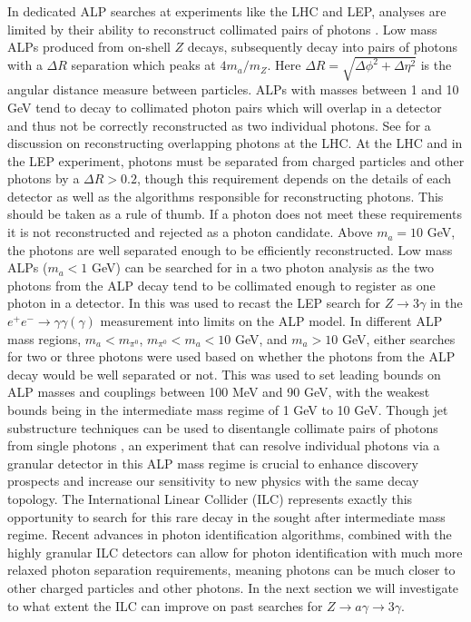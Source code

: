 \documentclass[aps,onecolumn,twoside,secnumarabic,12pt,balancelastpage,amsmath,amssymb,nofootinbib,hyperref=pdftex]{revtex4}
\begin{document}
In dedicated ALP searches at experiments like the LHC and LEP, analyses are limited by their ability to reconstruct collimated pairs of photons \cite{Mimasu:2014nea}. Low mass ALPs produced from on-shell $Z$ decays, subsequently decay into pairs of photons with a $\Delta R$ separation which peaks at $4 m_{a}/m_{Z}$. Here $\Delta R= \sqrt{\Delta\phi^{2} + \Delta\eta^{2}}$ is the angular distance measure between particles. ALPs with masses between 1 and 10 GeV tend to decay to collimated photon pairs which will overlap in a detector and thus not be correctly reconstructed as two individual photons. See \cite{Sheff:2020jyw} for a discussion on reconstructing overlapping photons at the LHC. At the LHC and in the LEP experiment, photons must be separated from charged particles and other photons by a $\Delta R  > 0.2$, though this requirement depends on the details of each detector as well as the algorithms responsible for reconstructing photons. This should be taken as a rule of thumb. If a photon does not meet these requirements it is not reconstructed and rejected as a photon candidate. Above $m_{a} = 10$ GeV, the photons are well separated enough to be efficiently reconstructed. Low mass ALPs ($m_{a} < 1$ GeV) can be searched for in a two photon analysis as the two photons from the ALP decay tend to be collimated enough to register as one photon in a detector.
\vskip 0.12in
In \cite{Jaeckel:2015jla} this was used to recast the LEP search for $Z\rightarrow 3\gamma$ in the $e^{+}e^{-}\rightarrow \gamma\gamma(\gamma)$ measurement into limits on the ALP model. In different ALP mass regions, $m_{a} < m_{\pi^{0}}$, $m_{\pi^{0}} < m_{a} < 10$ GeV, and $m_{a} > 10$ GeV, either searches for two or three photons were used based on whether the photons from the ALP decay would be well separated or not. This was used to set leading bounds on ALP masses and couplings between 100 MeV and 90 GeV, with the weakest bounds being in the intermediate mass regime of 1 GeV to 10 GeV. Though jet substructure techniques can be used to disentangle collimate pairs of photons from single photons \cite{Ellis:2012zp}, an experiment that can resolve individual photons via a granular detector in this ALP mass regime is crucial to enhance discovery prospects and increase our sensitivity to new physics with the same decay topology.
\vskip 0.12in
The International Linear Collider (ILC) represents exactly this opportunity to search for this rare decay in the sought after intermediate mass regime. Recent advances in photon identification algorithms, combined with the highly granular ILC detectors can allow for photon identification with much more relaxed photon separation requirements, meaning photons can be much closer to other charged particles and other photons. In the next section we will investigate to what extent the ILC can improve on past searches for $Z\rightarrow a\gamma \rightarrow 3\gamma$.
\end{document}
